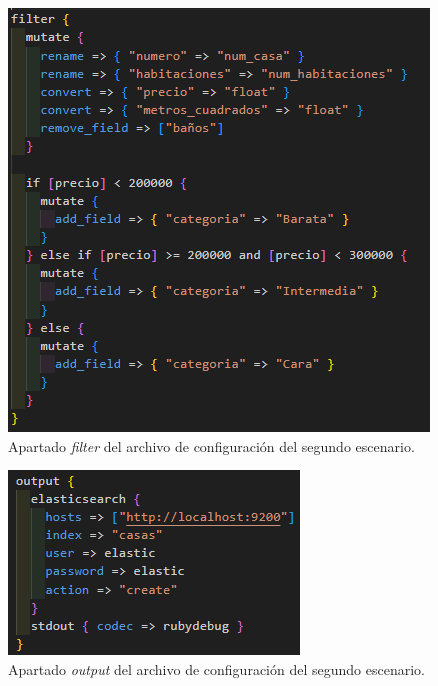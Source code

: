 \begin{figure}
    \centering
    \includegraphics[width=1\linewidth]{img/filter2.png}
    \caption{Apartado \textit{filter} del archivo de configuración del segundo escenario.}
    \label{fig:filter2}
\end{figure}

\begin{figure}
    \centering
    \includegraphics[width=1\linewidth]{img/output2.png}
    \caption{Apartado \textit{output} del archivo de configuración del segundo escenario.}
    \label{fig:output2}
\end{figure}

